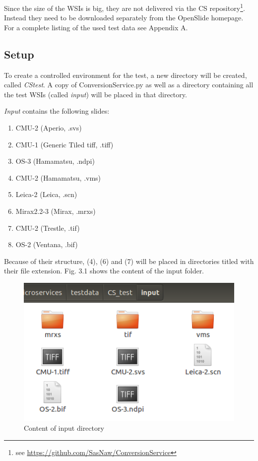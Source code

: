 Since the size of the WSIs is big, they are not delivered via the CS repository\footnote{see \url{https://github.com/SasNaw/ConversionService}}. Instead they need to be downloaded separately from the OpenSlide homepage. For a complete listing of the used test data see Appendix A.


\subsection{Setup}

To create a controlled environment for the test, a new directory will be created, called \emph{CS{\textunderscore}test}. A copy of ConversionService.py as well as a directory containing all the test WSIs (called \emph{input}) will be placed in that directory.

\emph{Input} contains the following slides:

\begin{enumerate}[(1)]
	\item CMU-2 (Aperio, .svs)
	\item CMU-1 (Generic Tiled tiff, .tiff)
	\item OS-3 (Hamamatsu, .ndpi)
	\item CMU-2 (Hamamatsu, .vms)
	\item Leica-2 (Leica, .scn)
	\item Mirax2.2-3 (Mirax, .mrxs)
	\item CMU-2 (Trestle, .tif)
	\item OS-2 (Ventana, .bif)
\end{enumerate}

Because of their structure, (4), (6) and (7) will be placed in directories titled with their file extension. Fig. 3.1 shows the content of the input folder.

\begin{figure}[H]
	\begin{center}
		\includegraphics[scale=0.5]{img/inputDir.png}
		\caption{Content of input directory}
		\label{fig:fig3.2}
	\end{center}
\end{figure}

